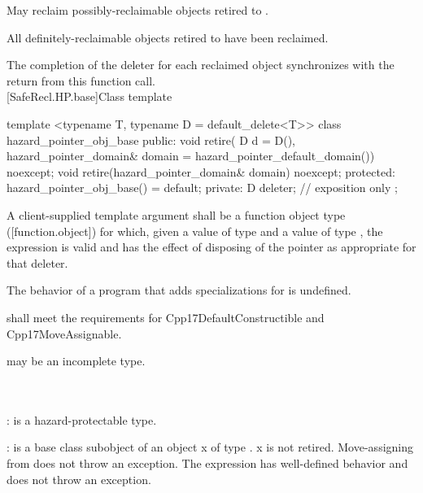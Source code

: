 \pnum
\effects May reclaim possibly-reclaimable objects retired to .

\pnum
\postconditions All definitely-reclaimable objects retired to  have been reclaimed.

\pnum
\sync The completion of the deleter for each reclaimed object synchronizes with the return from this function call.
\\

[SafeRecl.HP.base]{Class template }

\begin{codeblock}
template <typename T, typename D = default_delete<T>>
class hazard_pointer_obj_base {
public:
  void retire(
    D d = D(),
    hazard_pointer_domain& domain = hazard_pointer_default_domain()) noexcept;
  void retire(hazard_pointer_domain& domain) noexcept;
protected:
  hazard_pointer_obj_base() = default;
private:
  D deleter; // exposition only
};
\end{codeblock}

\pnum
A client-supplied template argument  shall be a function object type ([function.object])
for which, given a value  of type  and a value  of type , the expression  is valid and has the effect of disposing of the pointer as appropriate for that deleter.

\pnum
The behavior of a program that adds specializations for  is undefined.

\pnum
{} shall meet the requirements for Cpp17DefaultConstructible and Cpp17MoveAssignable.

\pnum
{} may be an incomplete type.
\\

\\
\hspace*{1.1em}\\
\hspace*{1.1em}

\pnum
{}:  is a hazard-protectable type.

\pnum
{}:  is a base class subobject of an object x of type . x is not retired.
Move-assigning  from  does not throw an exception. The expression  has well-defined behavior and does not throw an exception.

